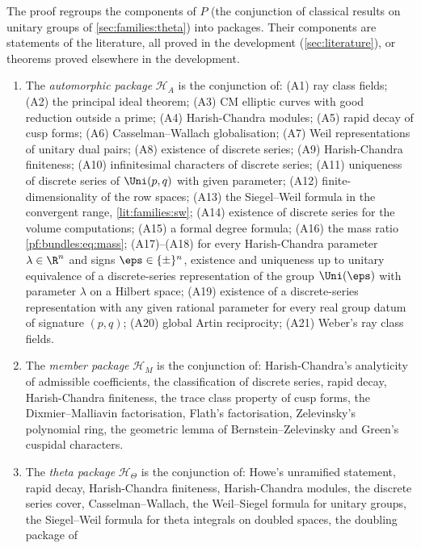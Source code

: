 The proof regroups the components of $P$ (the conjunction of classical results on unitary groups of \cref{sec:families:theta})
into packages. Their components are statements of the literature, all proved in the development (\cref{sec:literature}), or
theorems proved elsewhere in the development.

\begin{definition}[Packages]\label{pf:bundles:def:packages}
\begin{enumerate}[label=(\alph*)]
\item The \emph{automorphic package} $\mathcal H_A$ is the conjunction of: (A1) ray class fields; (A2) the principal ideal
theorem; (A3) CM elliptic curves with good reduction outside a prime; (A4) Harish-Chandra modules; (A5) rapid decay of cusp forms;
(A6) Casselman--Wallach globalisation; (A7) Weil representations of unitary dual pairs; (A8) existence of discrete series;
(A9) Harish-Chandra finiteness; (A10) infinitesimal characters of discrete series; (A11) uniqueness of discrete series of
$\Uni(p,q)$ with given parameter; (A12) finite-dimensionality of the row spaces; (A13) the Siegel--Weil formula in the convergent
range, \cref{lit:families:sw}; (A14) existence of discrete series for the volume computations; (A15) a formal degree formula;
(A16) the mass ratio \eqref{pf:bundles:eq:mass}; (A17)--(A18) for every Harish-Chandra parameter $\lambda\in\R^n$ and signs
$\eps\in\{\pm\}^n$, existence and uniqueness up to unitary equivalence of a discrete-series representation of the group
$\Uni(\eps)$ with parameter $\lambda$ on a Hilbert space; (A19) existence of a discrete-series representation with any given rational
parameter for every real group datum of signature $(p,q)$; (A20) global Artin reciprocity; (A21) Weber's ray class fields.
\item The \emph{member package} $\mathcal H_M$ is the conjunction of: Harish-Chandra's analyticity of admissible coefficients,
the classification of discrete series, rapid decay, Harish-Chandra finiteness, the trace class property of cusp forms, the
Dixmier--Malliavin factorisation, Flath's factorisation, Zelevinsky's polynomial ring, the geometric lemma of
Bernstein--Zelevinsky and Green's cuspidal characters.
\item The \emph{theta package} $\mathcal H_\Theta$ is the conjunction of: Howe's unramified statement, rapid decay,
Harish-Chandra finiteness, Harish-Chandra modules, the discrete series cover, Casselman--Wallach, the Weil--Siegel formula for
unitary groups, the Siegel--Weil formula for theta integrals on doubled spaces, the doubling package of

\end{enumerate}
\end{definition}
